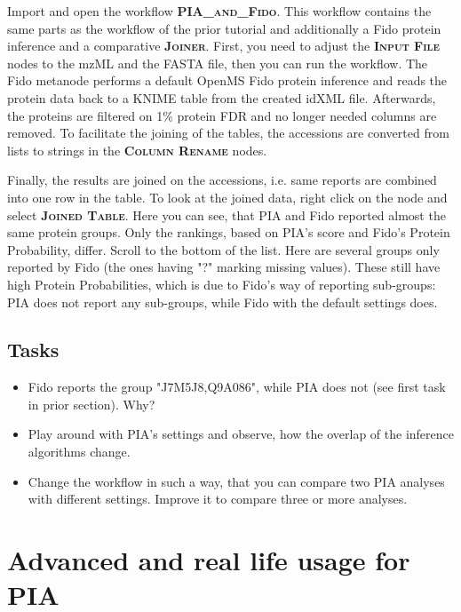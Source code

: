 \documentclass[a4paper,11pt,twoside]{article}
\newcommand{\menu}[1]{{\scshape\bfseries #1}}
\newcommand{\filepath}[1]{{\scshape\bfseries #1}}
\newcommand{\knimenode}[1]{{\scshape\bfseries #1}}
\begin{document}
Import and open the workflow \filepath{PIA\_and\_Fido}. This workflow contains
the same parts as the workflow of the prior tutorial and additionally a Fido
protein inference and a comparative \knimenode{Joiner}. First, you need to
adjust the \knimenode{Input File} nodes to the mzML and the FASTA file, then
you can run the workflow. The Fido metanode performs a default OpenMS Fido
protein inference and reads the protein data back to a KNIME table from the
created idXML file. Afterwards, the proteins are filtered on 1\% protein FDR
and no longer needed columns are removed. To facilitate the joining of the
tables, the accessions are converted from lists to strings in the
\knimenode{Column Rename} nodes.

Finally, the results are joined on the accessions, i.e. same reports are
combined into one row in the table. To look at the joined data, right click on
the node and select \menu{Joined Table}. Here you can see, that PIA and Fido
reported almost the same protein groups. Only the rankings, based on PIA's
score and Fido's Protein Probability, differ. Scroll to the bottom of the list.
Here are several groups only reported by Fido (the ones having "?" marking
missing values). These still have high Protein Probabilities, which is due to
Fido's way of reporting sub-groups: PIA does not report any sub-groups, while
Fido with the default settings does.


\subsection{Tasks}

\begin{itemize}
	\item Fido reports the group "J7M5J8,Q9A086", while PIA does not (see first
	task in prior section). Why?

	\item Play around with PIA's settings and observe, how the overlap of the
	inference algorithms change.

	\item Change the workflow in such a way, that you can compare two PIA
	analyses with different settings. Improve it to compare three or more
	analyses.
\end{itemize}



\newpage
\section{Advanced and real life usage for PIA}
\end{document}
